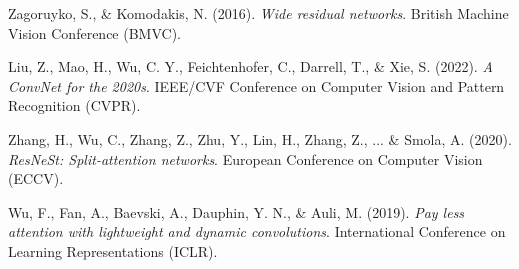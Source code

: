 \documentclass[11pt,a4paper]{article}
\begin{document}
\begin{thebibliography}{9}

Zagoruyko, S., \& Komodakis, N. (2016).
\textit{Wide residual networks}.
British Machine Vision Conference (BMVC).

Liu, Z., Mao, H., Wu, C. Y., Feichtenhofer, C., Darrell, T., \& Xie, S. (2022).
\textit{A ConvNet for the 2020s}.
IEEE/CVF Conference on Computer Vision and Pattern Recognition (CVPR).

Zhang, H., Wu, C., Zhang, Z., Zhu, Y., Lin, H., Zhang, Z., ... \& Smola, A. (2020).
\textit{ResNeSt: Split-attention networks}.
European Conference on Computer Vision (ECCV).

Wu, F., Fan, A., Baevski, A., Dauphin, Y. N., \& Auli, M. (2019).
\textit{Pay less attention with lightweight and dynamic convolutions}.
International Conference on Learning Representations (ICLR).

\end{thebibliography}
\end{document}
